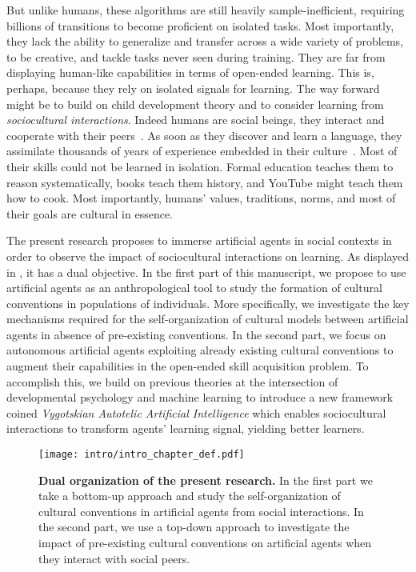 But unlike humans, these algorithms are still heavily sample-inefficient, requiring billions of transitions to become proficient on isolated tasks. Most importantly, they lack the ability to generalize and transfer across a wide variety of problems, to be creative, and tackle tasks never seen during training. They are far from displaying human-like capabilities in terms of open-ended learning. This is, perhaps, because they rely on isolated signals for learning. The way forward might be to build on child development theory and to consider learning from \textit{sociocultural interactions}. Indeed humans are social beings, they interact and cooperate with their peers~\citep{tomasello_cultural_1999,tomasello_understanding_2005, brewer2014addressing}. As soon as they discover and learn a language, they assimilate thousands of years of experience embedded in their culture~\citep{bruner1991narrative}.  Most of their skills could not be learned in isolation. Formal education teaches them to reason systematically, books teach them history, and YouTube might teach them how to cook. Most importantly, humans' values, traditions, norms, and most of their goals are cultural in essence.

The present research proposes to immerse artificial agents in social contexts in order to observe the impact of sociocultural interactions on learning. As displayed in , it has a dual objective. In the first part of this manuscript, we propose to use artificial agents as an anthropological tool to study the formation of cultural conventions in populations of individuals. More specifically, we investigate the key mechanisms required for the self-organization of cultural models between artificial agents in absence of pre-existing conventions. In the second part, we focus on autonomous artificial agents exploiting already existing cultural conventions to augment their capabilities in the open-ended skill acquisition problem. To accomplish this, we build on previous theories at the intersection of developmental psychology and machine learning to introduce a new framework coined \textit{Vygotskian Autotelic Artificial Intelligence} which enables sociocultural interactions to transform agents' learning signal, yielding better learners. 

%
\begin{figure}[!h]
\centering
\texttt{[image: intro/intro\_chapter\_def.pdf]}
\caption{\textbf{Dual organization of the present research.} In the first part we take a bottom-up approach and study the self-organization of cultural conventions in artificial agents from social interactions. In the second part, we use a top-down approach to investigate the impact of pre-existing cultural conventions on artificial agents when they interact with social peers.}
\label{fig:intro_chapter_def}
\end{figure}

